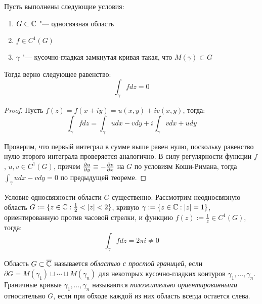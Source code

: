 \begin{theorem}
	Пусть выполнены следующие условия:
	\begin{enumerate}
		\item $G \subset \mathbb{C}$ "--- односвязная область
		\item $f \in C^1(G)$
		\item $\gamma$ "--- кусочно-гладкая замкнутая кривая такая, что $M(\gamma) \subset G$
	\end{enumerate}
	
	Тогда верно следующее равенство:
	\[\int_\gamma fdz = 0\]
\end{theorem}

\begin{proof}
	Пусть $f(z) = f(x + iy) = u(x, y) + iv(x, y)$, тогда:
	\[\int_\gamma fdz = \int_\gamma udx - vdy + i\int_\gamma vdx + udy\]
	
	Проверим, что первый интеграл в сумме выше равен нулю, поскольку равенство нулю второго интеграла проверяется аналогично. В силу регулярности функции $f$, $u, v \in C^1(G)$, причем $\frac{\partial u}{\partial y} \equiv -\frac{\partial v}{\partial x}$ на $G$ по условиям Коши-Римана, тогда $\int_\gamma udx - vdy = 0$ по предыдущей теореме.
\end{proof}

\begin{note}
	Условие односвязности области $G$ существенно. Рассмотрим неодносвязную область $G := \{z \in \mathbb{C} : \frac12 < |z| < 2\}$, кривую $\gamma := \{z \in \mathbb{C} : |z| = 1\}$, ориентированную против часовой стрелки, и функцию $f(z) := \frac 1z \in C^1(G)$, тогда:
	\[\int_\gamma fdz = 2\pi i  \ne 0\]
\end{note}

\begin{definition}
	Область $G \subset \overline{\mathbb{C}}$ называется \textit{областью с простой границей}, если $\partial{G} = M(\gamma_1) \sqcup \dotsb \sqcup M(\gamma_n)$ для некоторых кусочно-гладких контуров $\gamma_1, \dotsc, \gamma_n$. Граничные кривые $\gamma_1, \dotsc, \gamma_n$ называются \textit{положительно ориентированными} относительно $G$, если при обходе каждой из них область всегда остается слева.
\end{definition}

